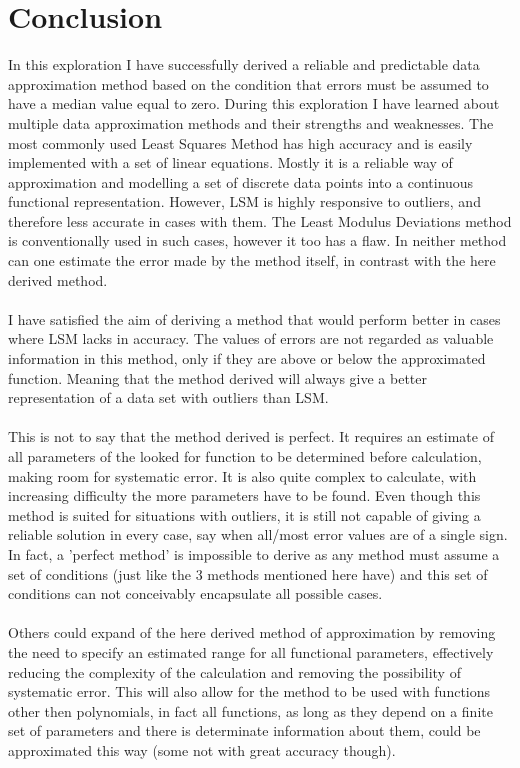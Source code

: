 \section{Conclusion}
In this exploration I have successfully derived a reliable and predictable data approximation method based on the condition that errors must be assumed to have a median value equal to zero. During this exploration I have learned about multiple data approximation methods and their strengths and weaknesses. The most commonly used Least Squares Method has high accuracy and is easily implemented with a set of linear equations. Mostly it is a reliable way of approximation and modelling a set of discrete data points into a continuous functional representation. However, LSM is highly responsive to outliers, and therefore less accurate in cases with them. The Least Modulus Deviations method is conventionally used in such cases, however it too has a flaw. In neither method can one estimate the error made by the method itself, in contrast with the here derived method.\\
\\
I have satisfied the aim of deriving a method that would perform better in cases where LSM lacks in accuracy. The values of errors are not regarded as valuable information in this method, only if they are above or below the approximated function. Meaning that the method derived will always give a better representation of a data set with outliers than LSM.\\
\\
This is not to say that the method derived is perfect. It requires an estimate of all parameters of the looked for function to be determined before calculation, making room for systematic error. It is also quite complex to calculate, with increasing difficulty the more parameters have to be found. Even though this method is suited for situations with outliers, it is still not capable of giving a reliable solution in every case, say when all/most error values are of a single sign. In fact, a 'perfect method' is impossible to derive as any method must assume a set of conditions (just like the 3 methods mentioned here have) and this set of conditions can not conceivably encapsulate all possible cases.\\
\\
Others could expand of the here derived method of approximation by removing the need to specify an estimated range for all functional parameters, effectively reducing the complexity of the calculation and removing the possibility of systematic error. This will also allow for the method to be used with functions other then polynomials, in fact all functions, as long as they depend on a finite set of parameters and there is determinate information about them, could be approximated this way (some not with great accuracy though).
\newpage
